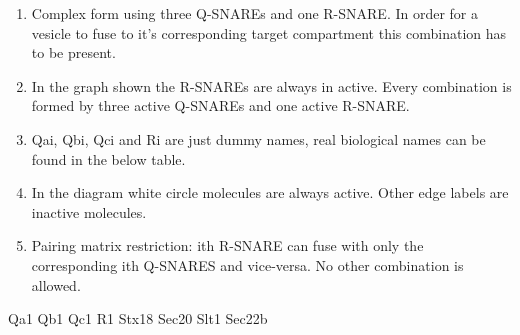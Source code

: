 
\begin{enumerate}
\item Complex form using three Q-SNAREs and one R-SNARE. In order for a vesicle to fuse to it's corresponding target compartment this combination has to be present.
\item In the graph shown the R-SNAREs are always in active. Every combination is formed by three active Q-SNAREs and one active R-SNARE.
\item  Qai, Qbi, Qci and Ri are just dummy names, real biological names can be found in the below table. 
\item In the diagram white circle molecules are always active. Other edge labels are inactive molecules.
\item Pairing matrix restriction: ith R-SNARE can fuse with only the corresponding ith Q-SNARES and vice-versa. No other combination is allowed.
\end{enumerate}



Qa1 Qb1 Qc1 R1
Stx18 Sec20 Slt1 Sec22b



